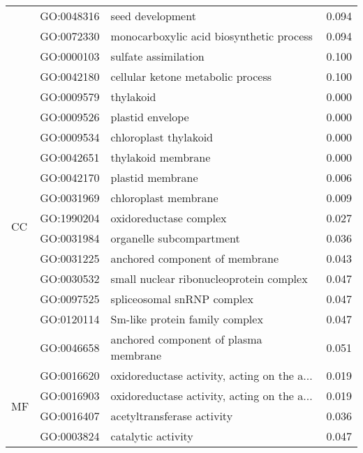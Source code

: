 \begin{longtable}{lllr}
   & GO:0048316 &                             seed development &         0.094 \\
   & GO:0072330 &     monocarboxylic acid biosynthetic process &         0.094 \\
   & GO:0000103 &                         sulfate assimilation &         0.100 \\
   & GO:0042180 &            cellular ketone metabolic process &         0.100 \\
\cline{1-4}
\multirow{13}{*}{CC} & GO:0009579 &                                    thylakoid &         0.000 \\
   & GO:0009526 &                             plastid envelope &         0.000 \\
   & GO:0009534 &                        chloroplast thylakoid &         0.000 \\
   & GO:0042651 &                           thylakoid membrane &         0.000 \\
   & GO:0042170 &                             plastid membrane &         0.006 \\
   & GO:0031969 &                         chloroplast membrane &         0.009 \\
   & GO:1990204 &                       oxidoreductase complex &         0.027 \\
   & GO:0031984 &                     organelle subcompartment &         0.036 \\
   & GO:0031225 &               anchored component of membrane &         0.043 \\
   & GO:0030532 &      small nuclear ribonucleoprotein complex &         0.047 \\
   & GO:0097525 &                   spliceosomal snRNP complex &         0.047 \\
   & GO:0120114 &               Sm-like protein family complex &         0.047 \\
   & GO:0046658 &        anchored component of plasma membrane &         0.051 \\
\cline{1-4}
\multirow{10}{*}{MF} & GO:0016620 &  oxidoreductase activity, acting on the a... &         0.019 \\
   & GO:0016903 &  oxidoreductase activity, acting on the a... &         0.019 \\
   & GO:0016407 &                   acetyltransferase activity &         0.036 \\
   & GO:0003824 &                           catalytic activity &         0.047 \\

\end{longtable}
